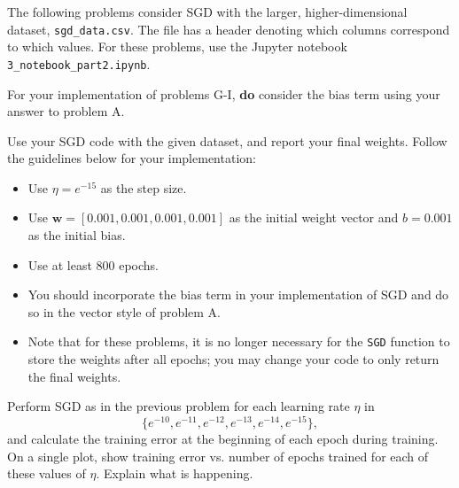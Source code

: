 \begin{solution}

\end{solution}


The following problems consider SGD with the larger, higher-dimensional dataset, \texttt{sgd_data.csv}. The file has a header denoting which columns correspond to which values. For these problems, use the Jupyter notebook \texttt{3_notebook_part2.ipynb}.

For your implementation of problems G-I, \textbf{do} consider the bias term using your answer to problem A.

\begin{problem}[6]
  Use your SGD code with the given dataset, and report your final weights. Follow the guidelines below for your implementation:

  \begin{itemize}
    \item Use $\eta = e^{-15}$ as the step size.  
    \item Use $\mathbf{w} = [0.001, 0.001, 0.001, 0.001]$ as the initial weight vector and $b = 0.001$ as the initial bias.
    \item Use at least 800 epochs.
    \item You should incorporate the bias term in your implementation of SGD and do so in the vector style of problem A.
    \item Note that for these problems, it is no longer necessary for the \texttt{SGD} function to store the weights after all epochs; you may change your code to only return the final weights.
  \end{itemize}
\end{problem}
\begin{solution}
\end{solution}

\begin{problem}[2]
  Perform SGD as in the previous problem for each learning rate $\eta$ in \[\{e^{-10}, e^{-11}, e^{-12}, e^{-13}, e^{-14}, e^{-15}\},\] and calculate the training error at the beginning of each epoch during training.  On a single plot, show training error vs. number of epochs trained for each of these values of $\eta$. Explain what is happening.
\end{problem}
\begin{solution}
  
\end{solution}


